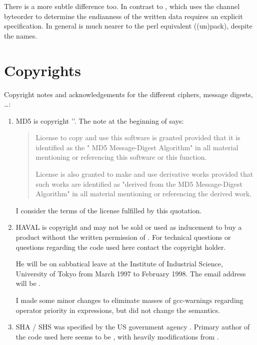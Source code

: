 \documentclass {report}
\begin{document}
There is a more subtle difference too. In contrast to ,
which uses the channel byteorder to determine the endianness of the
written data  requires an explicit specification. In
general  is much nearer to the perl equivalent
((un)pack), despite the names.



\chapter {Copyrights}\label {copyright}

Copyright notes and acknowledgements for the different ciphers,
message digests, \dots {}:

\begin {enumerate}
\item	MD5 is copyright '\rsadsi{}'. The note at the
	beginning of  says:

	\begin {quotation}
		License to copy and use this software is granted
		provided that it is identified as the "\rsadsi{} MD5
		Message-Digest Algorithm" in all material mentioning
		or referencing this software or this function.
                                                                  
		License is also granted to make and use derivative
		works provided that such works are identified as
		"derived from the \rsadsi{} MD5 Message-Digest
		Algorithm" in all material mentioning or referencing
		the derived work.
	\end   {quotation}

	I consider the terms of the license fulfilled by this
	quotation. 

\item	HAVAL is copyright \yuliang{} and may not be sold or used as
	inducement to buy a product without the written permission of
	\yuliang{}. For technical questions or questions regarding the
	code used here contact the copyright holder.

	He will be on sabbatical leave at the Institute of Industrial
	Science, University of Tokyo from March 1997 to February 1998.
	The email address will be .

	I made some minor changes to eliminate masses of \cmd
	{gcc}-warnings regarding operator priority in expressions, but
	did not change the semantics.


\item	SHA / SHS was specified by the US government agency
	\NIST. Primary author of the code used here seems to be
	\pgutmann, with heavily modifications from \uh. 


\end{enumerate}
\end{document}
